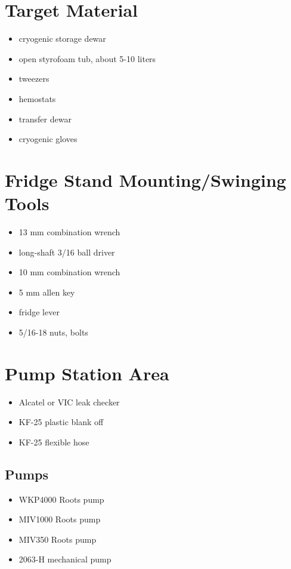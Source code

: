 \section{Target Material}
\begin{itemize}
 \item cryogenic storage \lnn{} dewar
\item open styrofoam tub, about 5-10 liters
\item tweezers
\item hemostats
\item \lnn{} transfer dewar
\item cryogenic gloves
\end{itemize}

\section{Fridge Stand Mounting/Swinging Tools}

\begin{itemize}
  \item 13 mm combination wrench
  \item long-shaft 3/16\inches{} ball driver
  \item 10 mm combination wrench
  \item 5 mm allen key
  \item fridge lever
  \item {} 5/16\inches{}-18 nuts, bolts
\end{itemize}


\section{Pump Station Area}
  \begin{itemize}
   \item Alcatel or VIC leak checker
   \item KF-25 plastic blank off
   \item KF-25 flexible hose
  \end{itemize}

  \subsection{\het{} Pumps} %
\begin{itemize}
 \item {} WKP4000 Roots pump 
 \item {} MIV1000 Roots pump
 \item {} MIV350 Roots pump
 \item {} 2063-H mechanical pump
\end{itemize}

